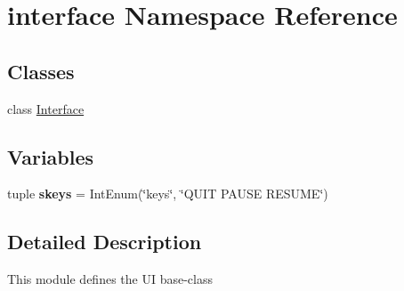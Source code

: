 \hypertarget{namespaceinterface}{\section{interface \-Namespace \-Reference}
\label{namespaceinterface}
}
\subsection*{\-Classes}
\begin{DoxyCompactItemize}
\item 
class \hyperlink{classinterface_1_1_interface}{\-Interface}
\end{DoxyCompactItemize}
\subsection*{\-Variables}
\begin{DoxyCompactItemize}
\item 
\hypertarget{namespaceinterface_a20560085f25b5431ac065e81643fa7c3}{tuple {\bfseries skeys} = \-Int\-Enum(\char`\"{}keys\char`\"{}, \char`\"{}\-Q\-U\-I\-T \-P\-A\-U\-S\-E \-R\-E\-S\-U\-M\-E\char`\"{})}\label{namespaceinterface_a20560085f25b5431ac065e81643fa7c3}

\end{DoxyCompactItemize}


\subsection{\-Detailed \-Description}
\begin{DoxyVerb}
    This module defines the UI base-class
\end{DoxyVerb}
 